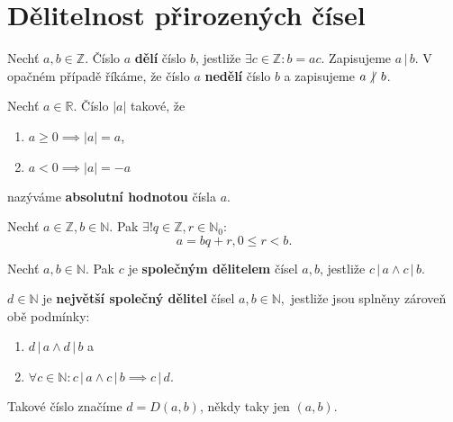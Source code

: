 \section{Dělitelnost přirozených čísel}
\begin{definition}
  Nechť $a,b\in\mathbb Z.$ Číslo $a$ \textbf{dělí} číslo $b$, jestliže $\exists c \in \mathbb Z: b=ac$. Zapisujeme $a\, | \, b$.
  V opačném případě říkáme, že číslo $a$ \textbf{nedělí} číslo $b$ a zapisujeme $a \, \centernot | \, b$.
\end{definition}

\begin{definition}
  Nechť $a\in \mathbb R$. Číslo $|a|$ takové, že
  \begin{enumerate}[$i.$]
    \item $a\geq 0 \implies |a| = a$,
    \item $a<0 \implies |a| = - a$
  \end{enumerate}
  nazýváme \textbf{absolutní hodnotou} čísla $a$.
\end{definition}

\begin{veta}
  Nechť $a\in \mathbb Z, b\in \mathbb N.$ Pak $\exists ! q \in \mathbb Z, r\in \mathbb N_0:$
  $$a=bq+r, 0 \leq r < b.$$
\end{veta}

\begin{definition}
  Nechť $a,b\in \mathbb N$. Pak $c$ je \textbf{společným dělitelem} čísel $a,b$, jestliže $c \, | \, a \land c\, | \, b.$
\end{definition}

\begin{definition}
  $d\in \mathbb N$ je \textbf{největší společný dělitel} čísel $a,b \in \mathbb N,$ jestliže jsou splněny zároveň obě podmínky:
  \begin{enumerate}[$i.$]
    \item $d\, | \, a \land d \, | \, b$ a
    \item $\forall c \in \mathbb N: c \, | \, a \land c \, | \, b \implies c \, | \, d.$
  \end{enumerate}
  Takové číslo značíme $d=D(a,b)$, někdy taky jen $(a,b)$.
\end{definition}

